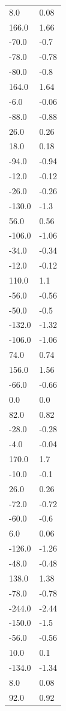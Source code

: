 \begin{longtable}{ll}
8.0 & 0.08 \\
166.0 & 1.66 \\
-70.0 & -0.7 \\
-78.0 & -0.78 \\
-80.0 & -0.8 \\
164.0 & 1.64 \\
-6.0 & -0.06 \\
-88.0 & -0.88 \\
26.0 & 0.26 \\
18.0 & 0.18 \\
-94.0 & -0.94 \\
-12.0 & -0.12 \\
-26.0 & -0.26 \\
-130.0 & -1.3 \\
56.0 & 0.56 \\
-106.0 & -1.06 \\
-34.0 & -0.34 \\
-12.0 & -0.12 \\
110.0 & 1.1 \\
-56.0 & -0.56 \\
-50.0 & -0.5 \\
-132.0 & -1.32 \\
-106.0 & -1.06 \\
74.0 & 0.74 \\
156.0 & 1.56 \\
-66.0 & -0.66 \\
0.0 & 0.0 \\
82.0 & 0.82 \\
-28.0 & -0.28 \\
-4.0 & -0.04 \\
170.0 & 1.7 \\
-10.0 & -0.1 \\
26.0 & 0.26 \\
-72.0 & -0.72 \\
-60.0 & -0.6 \\
6.0 & 0.06 \\
-126.0 & -1.26 \\
-48.0 & -0.48 \\
138.0 & 1.38 \\
-78.0 & -0.78 \\
-244.0 & -2.44 \\
-150.0 & -1.5 \\
-56.0 & -0.56 \\
10.0 & 0.1 \\
-134.0 & -1.34 \\
8.0 & 0.08 \\
92.0 & 0.92 \\

\end{longtable}
